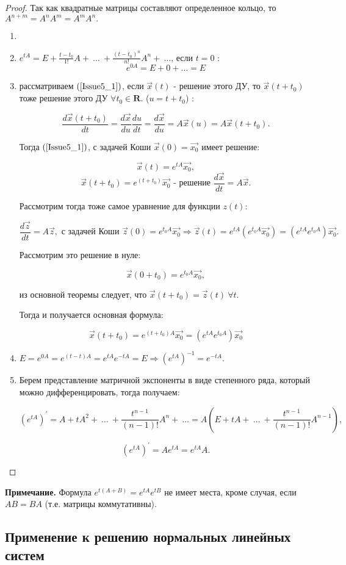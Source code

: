 \begin{proof}

Так как квадратные матрицы составляют определенное кольцо, то \\
$A^{n+m} = A^nA^m=A^mA^n.$

\begin{enumerate}

\item

\item $ e^{tA} = E + \frac{t-t_0}{1!}A +\ \dots\ + \frac{(t-t_0)^n}{n!}A^n+\ \dots $, если $t = 0$ :
\[ e^{0A} = E + 0 + \dots = E\]

\item рассматриваем $(\ref{Issue5_1})$, если $\vec{x}(t)$ - решение этого ДУ, то $\vec{x}(t+t_0)$ тоже решение этого ДУ $\forall t_0 \in \mathbf{R}$. ($u = t + t_0$) :

\[ \frac{d\vec{x}(t+t_0)}{dt} = \frac{d\vec{x}}{du}\frac{du}{dt} = \frac{d\vec{x}}{du} = A\vec{x}(u) = A\vec{x}(t+t_0).\]

Тогда $(\ref{Issue5_1})$, с задачей Коши $\vec{x}(0) = \vec{x_0}$ имеет решение:

\[ \vec{x}(t) =  e^{tA}\vec{x_0},\]
\[ \vec{x}(t+t_0) = e^{(t+t_0)}\vec{x_0}\text{ - решение }\frac{d\vec{x}}{dt} = A\vec{x}. \]

Рассмотрим тогда тоже самое уравнение для функции $z(t)$:

\[ \frac{d\vec{z}}{dt} = A\vec{z}, \text{ с задачей Коши } \vec{z}(0) = e^{t_0A}\vec{x_0} \Rightarrow \vec{z}(t) = e^{tA} (e^{t_0A}\vec{x_0}) = (e^{tA}e^{t_0A})\vec{x_0}.\]

Рассмотрим это решение в нуле:

\[ \vec{x}(0 + t_0) = e^{t_0A}\vec{x_0},\]

из основной теоремы следует, что $\vec{x}(t+t_0) = \vec{z}(t)\ \forall t$.

Тогда и получается основная формула:

\[ \vec{x}(t+t_0) = e^{(t+t_0)A}\vec{x_0} = (e^{tA}e^{t_0A})\vec{x_0}\]

\item $E = e^{0A} = e^{(t-t)A} = e^{tA}e^{-tA} = E \Rightarrow \left(e^{tA}\right)^{-1} = e^{-tA}.$

\item Берем представление матричной экспоненты в виде степенного ряда, который можно дифференцировать, тогда получаем:

\[ (e^{tA})^{'} = A + tA^2 +\ \dots\ +\frac{t^{n-1}}{(n-1)!} A^n +\ \dots = A\left(E + tA +\ \dots\ + \frac{t^{n-1}}{(n-1)!}A^{n-1}\right),\]

\[ (e^{tA})^{'} = Ae^{tA} = e^{tA}A.\]

\end{enumerate}

\end{proof}

\textbf{Примечание.} Формула $e^{t(A+B)} = e^{tA}e^{tB}$ не имеет места, кроме случая, если $AB = BA$ (т.е. матрицы коммутативны).

\subsection{Применение к решению нормальных линейных систем}




 
